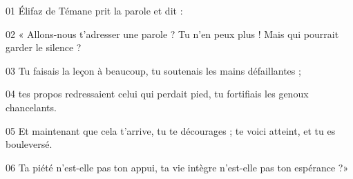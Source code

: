 01 Élifaz de Témane prit la parole et dit :

02 « Allons-nous t’adresser une parole ? Tu n’en peux plus ! Mais qui pourrait garder le silence ?

03 Tu faisais la leçon à beaucoup, tu soutenais les mains défaillantes ;

04 tes propos redressaient celui qui perdait pied, tu fortifiais les genoux chancelants.

05 Et maintenant que cela t’arrive, tu te décourages ; te voici atteint, et tu es bouleversé.

06 Ta piété n’est-elle pas ton appui, ta vie intègre n’est-elle pas ton espérance ?»